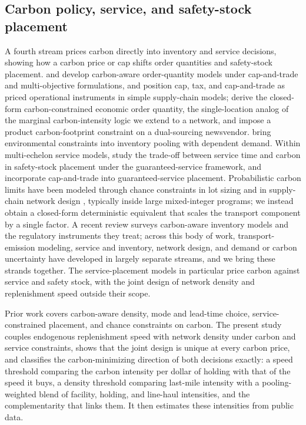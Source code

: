 \documentclass[11pt]{article}
\theoremstyle{definition}
\theoremstyle{remark}
\theoremstyle{plain}
\begin{document}
\subsection{Carbon policy, service, and safety-stock placement}

A fourth stream prices carbon directly into inventory and service decisions, showing how a carbon price or cap
shifts order quantities and safety-stock placement.
\citet{hua2011managing} and \citet{bouchery2012including} develop carbon-aware order-quantity models under
cap-and-trade and multi-objective formulations, and \citet{benjaafar2013carbon} position cap, tax, and
cap-and-trade as priced operational instruments in simple supply-chain models; \citet{chen2013carbon} derive the
closed-form carbon-constrained economic order quantity, the single-location analog of the marginal
carbon-intensity logic we extend to a network, and \citet{arikan2014single} impose a product carbon-footprint
constraint on a dual-sourcing newsvendor. \citet{silbermayr2017inventory} bring environmental constraints into
inventory pooling with dependent demand. Within multi-echelon service models,
\citet{ni2015tradeoff} study the trade-off between service time and carbon in safety-stock placement under the
guaranteed-service framework, and \citet{wang2025inventory} incorporate cap-and-trade into guaranteed-service
placement. Probabilistic carbon limits have been modeled through chance constraints in lot sizing
\citep{koca2021stochastic} and in supply-chain network design \citep{shaw2016low}, typically inside large
mixed-integer programs; we instead obtain a closed-form deterministic equivalent that scales the transport component by a single factor. A recent review \citep{sebatjane2025sustainable} surveys carbon-aware inventory
models and the regulatory instruments they treat; across this body of work, transport-emission modeling, service and inventory, network design, and demand or
carbon uncertainty have developed in largely separate streams, and we bring these strands together. The service-placement models in particular price carbon against service
and safety stock, with the joint design of network density and replenishment speed outside their scope. 

Prior work covers carbon-aware density, mode and lead-time choice, service-constrained placement, and chance
constraints on carbon. The present study couples endogenous replenishment speed with network density under
carbon and service constraints, shows that the joint design is unique at every carbon price, and classifies the
carbon-minimizing direction of both decisions exactly: a speed threshold comparing the carbon intensity per
dollar of holding with that of the speed it buys, a density threshold comparing last-mile intensity with a
pooling-weighted blend of facility, holding, and line-haul intensities, and the complementarity that links them.
It then estimates these intensities from public data.
\end{document}
